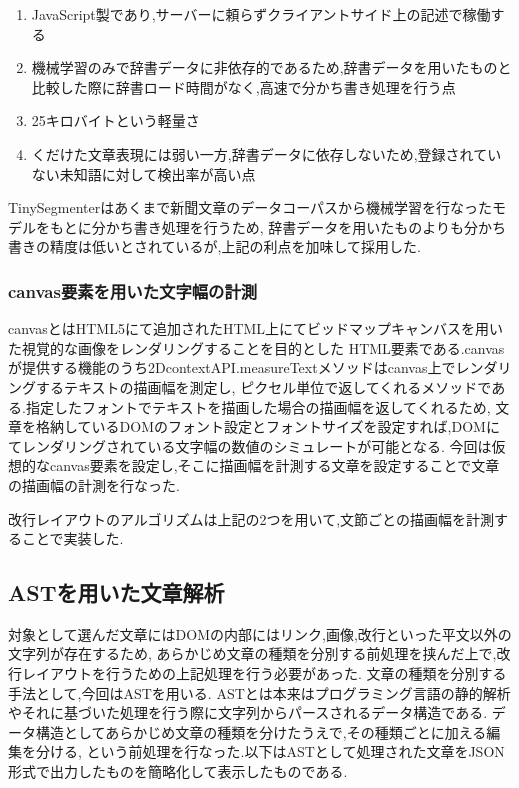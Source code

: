 \begin{enumerate}
	\item JavaScript製であり,サーバーに頼らずクライアントサイド上の記述で稼働する
	\item 機械学習のみで辞書データに非依存的であるため,辞書データを用いたものと比較した際に辞書ロード時間がなく,高速で分かち書き処理を行う点
	\item 25キロバイトという軽量さ
	\item くだけた文章表現には弱い一方,辞書データに依存しないため,登録されていない未知語に対して検出率が高い点
\end{enumerate}
TinySegmenterはあくまで新聞文章のデータコーパスから機械学習を行なったモデルをもとに分かち書き処理を行うため,
辞書データを用いたものよりも分かち書きの精度は低いとされているが,上記の利点を加味して採用した.


\subsubsection{canvas要素を用いた文字幅の計測}
canvasとはHTML5にて追加されたHTML上にてビッドマップキャンバスを用いた視覚的な画像をレンダリングすることを目的とした
HTML要素である.canvasが提供する機能のうち2DcontextAPI.measureTextメソッドはcanvas上でレンダリングするテキストの描画幅を測定し,
ピクセル単位で返してくれるメソッドである.指定したフォントでテキストを描画した場合の描画幅を返してくれるため,
文章を格納しているDOMのフォント設定とフォントサイズを設定すれば,DOMにてレンダリングされている文字幅の数値のシミュレートが可能となる.
今回は仮想的なcanvas要素を設定し,そこに描画幅を計測する文章を設定することで文章の描画幅の計測を行なった.

改行レイアウトのアルゴリズムは上記の2つを用いて,文節ごとの描画幅を計測することで実装した.

\subsection{ASTを用いた文章解析}
対象として選んだ文章にはDOMの内部にはリンク,画像,改行といった平文以外の文字列が存在するため,
あらかじめ文章の種類を分別する前処理を挟んだ上で,改行レイアウトを行うための上記処理を行う必要があった.
文章の種類を分別する手法として,今回はAST\footnotemark[4]を用いる.
ASTとは本来はプログラミング言語の静的解析やそれに基づいた処理を行う際に文字列からパースされるデータ構造である.
データ構造としてあらかじめ文章の種類を分けたうえで,その種類ごとに加える編集を分ける,
という前処理を行なった.以下はASTとして処理された文章をJSON形式で出力したものを簡略化して表示したものである.


